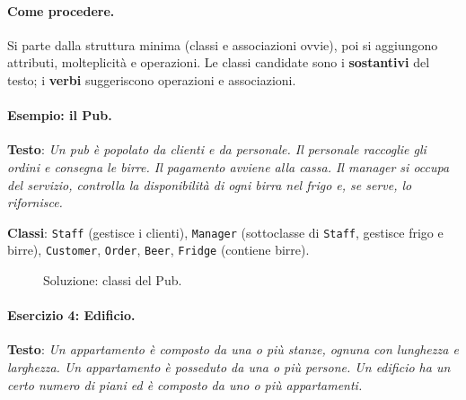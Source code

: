 \documentclass[12pt]{extarticle}
\newcommand{\cn}[1]{\makebox[\linewidth][c]{\textbf{#1}}}
\begin{document}
\paragraph{Come procedere.} Si parte dalla struttura minima (classi e associazioni ovvie), poi si aggiungono attributi, molteplicità e operazioni. Le classi candidate sono i \textbf{sostantivi} del testo; i \textbf{verbi} suggeriscono operazioni e associazioni.

\paragraph{Esempio: il Pub.}
\textbf{Testo}: \textit{Un pub è popolato da clienti e da personale. Il personale raccoglie gli ordini e consegna le birre. Il pagamento avviene alla cassa. Il manager si occupa del servizio, controlla la disponibilità di ogni birra nel frigo e, se serve, lo rifornisce.}

\noindent \textbf{Classi}: \texttt{Staff} (gestisce i clienti), \texttt{Manager} (sottoclasse di \texttt{Staff}, gestisce frigo e birre), \texttt{Customer}, \texttt{Order}, \texttt{Beer}, \texttt{Fridge} (contiene birre).

\begin{figure}[H]
    \centering
{}
    \caption{Soluzione: classi del Pub.}
\end{figure}

\paragraph{Esercizio 4: Edificio.}
\textbf{Testo}: \textit{Un appartamento è composto da una o più stanze, ognuna con lunghezza e larghezza. Un appartamento è posseduto da una o più persone. Un edificio ha un certo numero di piani ed è composto da uno o più appartamenti.}
\end{document}
